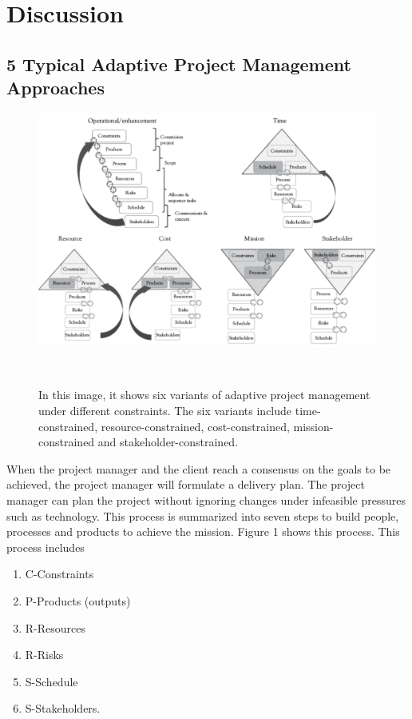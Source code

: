 \documentclass{sigchi}
\begin{document}
\section{Discussion}


\subsection{5 Typical Adaptive Project Management Approaches }

\begin{figure}
  \centering
  \includegraphics[width=1.75\columnwidth]{figures/approach}
  \caption{In this image, it shows six variants of adaptive project management under different constraints. The six variants include time-constrained, resource-constrained, cost-constrained, mission-constrained and stakeholder-constrained.}~\label{fig:figure2}
\end{figure}

When the project manager and the client reach a consensus on the goals to be achieved, the project manager will formulate a delivery plan. The project manager can plan the project without ignoring changes under infeasible pressures such as technology. This process is summarized into seven steps to build people, processes and products to achieve the mission. Figure 1 shows this process. This process includes 
    \begin{itemize}
    \begin{enumerate}
    \item C-Constraints
    \item P-Products (outputs)
    \item R-Resources
    \item R-Risks
    \item S-Schedule
    \item S-Stakeholders.
    \end{enumerate}
    \end{itemize}
\end{document}

